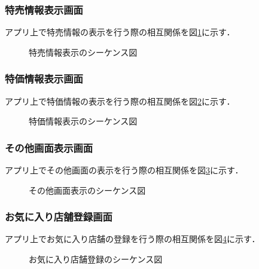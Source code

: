 \documentclass[a4j]{jarticle}
\begin{document}
  \subsubsection{特売情報表示画面}
  \label{tabs:SpecialSaleSequence}
  アプリ上で特売情報の表示を行う際の相互関係を図\ref{tab:SpecialSaleSequence}に示す．
  \begin{figure}[H]
  \begin{center}
  \caption{特売情報表示のシーケンス図}
  \label{tab:SpecialSaleSequence}
  \end{center}
  \end{figure}

  \subsubsection{特価情報表示画面}
  \label{tabs:SpecialPriceSequence}
  アプリ上で特価情報の表示を行う際の相互関係を図\ref{tab:SpecialPriceSequence}に示す．
  \begin{figure}[H]
  \begin{center}
  \caption{特価情報表示のシーケンス図}
  \label{tab:SpecialPriceSequence}
  \end{center}
  \end{figure}

  \subsubsection{その他画面表示画面}
  \label{tabs:OtherSequence}
  アプリ上でその他画面の表示を行う際の相互関係を図\ref{tab:OtherSequence}に示す．
  \begin{figure}[H]
  \begin{center}
  \caption{その他画面表示のシーケンス図}
  \label{tab:OtherSequence}
  \end{center}
  \end{figure}

  \subsubsection{お気に入り店舗登録画面}
  \label{tabs:FavoriteShopSequence}
  アプリ上でお気に入り店舗の登録を行う際の相互関係を図\ref{tab:FavoriteShopSequence}に示す．
  \begin{figure}[H]
  \begin{center}
  \caption{お気に入り店舗登録のシーケンス図}
  \label{tab:FavoriteShopSequence}
  \end{center}
  \end{figure}
\end{document}
